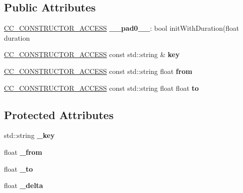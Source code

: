 \subsection*{Public Attributes}
\begin{DoxyCompactItemize}
\item 
\mbox{\label{classActionTween_a4af162e64f1d98f7c41aa884ba6e176c}} 
\hyperlink{_2cocos2d_2cocos_2base_2ccConfig_8h_a25ef1314f97c35a2ed3d029b0ead6da0}{C\+C\+\_\+\+C\+O\+N\+S\+T\+R\+U\+C\+T\+O\+R\+\_\+\+A\+C\+C\+E\+SS} {\bfseries \+\_\+\+\_\+pad0\+\_\+\+\_\+}\+: bool init\+With\+Duration(float duration
\item 
\mbox{\label{classActionTween_ab890cb9e0a31038c25e1ee4e635ad801}} 
\hyperlink{_2cocos2d_2cocos_2base_2ccConfig_8h_a25ef1314f97c35a2ed3d029b0ead6da0}{C\+C\+\_\+\+C\+O\+N\+S\+T\+R\+U\+C\+T\+O\+R\+\_\+\+A\+C\+C\+E\+SS} const std\+::string \& {\bfseries key}
\item 
\mbox{\label{classActionTween_a960235b0b1059be8725611453184ae44}} 
\hyperlink{_2cocos2d_2cocos_2base_2ccConfig_8h_a25ef1314f97c35a2ed3d029b0ead6da0}{C\+C\+\_\+\+C\+O\+N\+S\+T\+R\+U\+C\+T\+O\+R\+\_\+\+A\+C\+C\+E\+SS} const std\+::string float {\bfseries from}
\item 
\mbox{\label{classActionTween_af195d0d23593584f64da6606feadeb39}} 
\hyperlink{_2cocos2d_2cocos_2base_2ccConfig_8h_a25ef1314f97c35a2ed3d029b0ead6da0}{C\+C\+\_\+\+C\+O\+N\+S\+T\+R\+U\+C\+T\+O\+R\+\_\+\+A\+C\+C\+E\+SS} const std\+::string float float {\bfseries to}
\end{DoxyCompactItemize}
\subsection*{Protected Attributes}
\begin{DoxyCompactItemize}
\item 
\mbox{\label{classActionTween_ace70ff6f62503edeaa3470f3fb9cdc94}} 
std\+::string {\bfseries \+\_\+key}
\item 
\mbox{\label{classActionTween_a8d1d13931171f89a65608b06e2f1b11a}} 
float {\bfseries \+\_\+from}
\item 
\mbox{\label{classActionTween_ad7cf624e730b8af6f90a43cb2327f838}} 
float {\bfseries \+\_\+to}
\item 
\mbox{\label{classActionTween_a7407cbcfeea277161f5a095bf0348f60}} 
float {\bfseries \+\_\+delta}
\end{DoxyCompactItemize}
